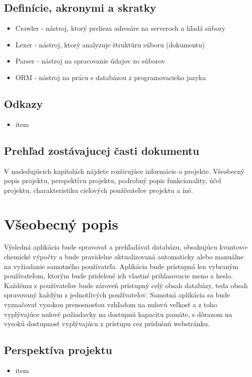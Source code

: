 \documentclass[12pt,a4paper]{article}
\begin{document}
\subsection{Definície, akronymi a skratky}
\begin{itemize}
	\item Crawler - nástroj, ktorý prelieza adresáre na serveroch a hľadá súbory
	\item Lexer - nástroj, ktorý analyzuje štruktúru súboru (dokumentu)
	\item Parser - nástroj na spracovanie údajov zo súborov
	\item ORM - nástroj na prácu s databázou z programovacieho jazyka
\end{itemize}

\subsection{Odkazy}
\begin{itemize}
	\item item
\end{itemize}

\subsection{Prehľad zostávajucej časti dokumentu}
V nasledujúcich kapitolách nájdete rozširujúce informácie o projekte.
Všeobecný popis projektu, perspektívu projektu, podrobný popis funkcionality, účel projektu, charakteristiku cieľových používateľov projektu a iné.


\section{Všeobecný popis}
Výsledná aplikácia bude spravovať a prehľadávať databázu, obsahujúcu kvantovo-chemické výpočty a bude pravidelne aktualizovaná automaticky alebo manuálne na vyžiadanie samotného používateľa. Aplikácia bude prístupná len vybraným používateľom, ktorým bude pridelené ich vlastné prihlasovacie 
meno a heslo. Každému z používateľov bude zároveň prístupný celý obsah databázy, teda obsah spravovaný každým z jednotlivých používateľov. Samotná aplikácia sa bude vyznačovať vysokou prenosnosťou vzhľadom na nulovú veľkosť a z toho vyplývajúce nulové požiadavky na dostupnú kapacitu pamäte, s dôrazom na vysokú dostupnosť vyplývajúcu z prístupu cez príslušnú webstránku.

\subsection{Perspektíva projektu}
\begin{itemize}
	\item item
\end{itemize}
\end{document}

